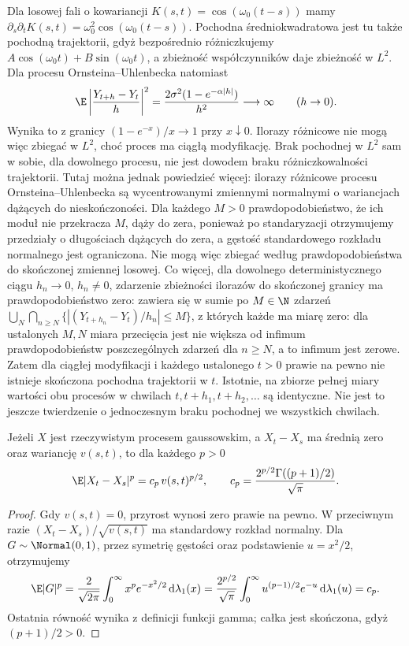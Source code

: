 \begin{przyklad}
Dla losowej fali o kowariancji
$K(s,t)=\cos(\omega_0(t-s))$ mamy
$\partial_s\partial_t K(s,t)=\omega_0^2\cos(\omega_0(t-s))$.
Pochodna średniokwadratowa jest tu także pochodną
trajektorii, gdyż bezpośrednio różniczkujemy
$A\cos(\omega_0t)+B\sin(\omega_0t)$, a zbieżność
współczynników daje zbieżność w $L^2$.
Dla procesu Ornsteina--Uhlenbecka natomiast
\[
\E\left|\frac{Y_{t+h}-Y_t}{h}\right|^2
=\frac{2\sigma^2(1-e^{-\alpha|h|})}{h^2}
\longrightarrow\infty\qquad(h\to0).
\]
Wynika to z granicy $(1-e^{-x})/x\to1$ przy
$x\downarrow0$. Ilorazy różnicowe nie mogą więc
zbiegać w $L^2$, choć proces ma ciągłą modyfikację.
Brak pochodnej w $L^2$ sam w sobie, dla dowolnego
procesu, nie jest dowodem braku różniczkowalności
trajektorii. Tutaj można jednak powiedzieć więcej:
ilorazy różnicowe procesu Ornsteina--Uhlenbecka
są wycentrowanymi zmiennymi normalnymi o wariancjach
dążących do nieskończoności. Dla każdego $M>0$
prawdopodobieństwo, że ich moduł nie przekracza $M$,
dąży do zera, ponieważ po standaryzacji otrzymujemy
przedziały o długościach dążących do zera, a gęstość
standardowego rozkładu normalnego jest ograniczona.
Nie mogą więc zbiegać według prawdopodobieństwa do
skończonej zmiennej losowej. Co więcej, dla dowolnego
deterministycznego ciągu $h_n\to0$, $h_n\ne0$,
zdarzenie zbieżności ilorazów do skończonej granicy
ma prawdopodobieństwo zero: zawiera się w sumie po
$M\in\N$ zdarzeń
$\bigcup_N\bigcap_{n\ge N}\{|(Y_{t+h_n}-Y_t)/h_n|\le M\}$,
z których każde ma miarę zero: dla ustalonych $M,N$
miara przecięcia jest nie większa od infimum
prawdopodobieństw poszczególnych zdarzeń dla $n\ge N$,
a to infimum jest zerowe.
Zatem dla ciągłej modyfikacji i każdego ustalonego
$t>0$ prawie na pewno nie istnieje skończona pochodna
trajektorii w $t$. Istotnie, na zbiorze pełnej miary
wartości obu procesów w chwilach $t,t+h_1,t+h_2,\ldots$
są identyczne.
Nie jest to jeszcze twierdzenie o jednoczesnym braku
pochodnej we wszystkich chwilach.
\end{przyklad}

\begin{lemat}
Jeżeli $X$ jest rzeczywistym procesem gaussowskim,
a $X_t-X_s$ ma średnią zero oraz wariancję $v(s,t)$,
to dla każdego $p>0$
\[
\E|X_t-X_s|^p=c_p\,v(s,t)^{p/2},\qquad
c_p=\frac{2^{p/2}\Gamma((p+1)/2)}{\sqrt\pi}.
\]
\end{lemat}
\begin{proof}
Gdy $v(s,t)=0$, przyrost wynosi zero prawie na pewno.
W przeciwnym razie $(X_t-X_s)/\sqrt{v(s,t)}$ ma standardowy
rozkład normalny. Dla $G\sim\Normal(0,1)$, przez symetrię gęstości
oraz podstawienie $u=x^2/2$, otrzymujemy
\[
\E|G|^p
=\frac{2}{\sqrt{2\pi}}\int_0^\infty
 x^p e^{-x^2/2}\,\mathrm d\lambda_1(x)
=\frac{2^{p/2}}{\sqrt\pi}\int_0^\infty
 u^{(p-1)/2}e^{-u}\,\mathrm d\lambda_1(u)=c_p.
\]
Ostatnia równość wynika z definicji funkcji gamma;
całka jest skończona, gdyż $(p+1)/2>0$.
\end{proof}


